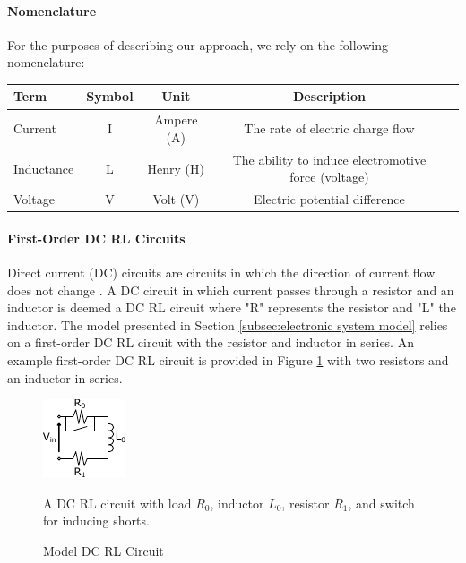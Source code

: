 \paragraph{Nomenclature}
For the purposes of describing our approach, we rely on the following nomenclature:

\begin{center}
\bgroup
\begin{tabular}{| l | c | c | c | l |}
    \hline
    Term & Symbol & Unit & Description\\  \hline \hline \cline{1-4}
    Current & I & Ampere (A) & The rate of electric charge flow \\ \cline{1-4}
    Inductance & L & Henry (H) & The ability to induce electromotive force (voltage)\\ \cline{1-4}
    Voltage & V & Volt (V) & Electric potential difference \\ \cline{1-4}
    \hline  
\end{tabular}
\egroup
\end{center}

\paragraph{First-Order DC RL Circuits}
Direct current (DC) circuits are circuits in which the direction of current flow does not change \cite{young_sears_2012}.
A DC circuit in which current passes through a resistor and an inductor is deemed a DC RL circuit where "R" represents the resistor and "L" the inductor.
The model presented in Section \ref{subsec:electronic system model} relies on a first-order DC RL circuit with the resistor and inductor in series.
An example first-order DC RL circuit is provided in Figure \ref{fig:ModelDCRL} with two resistors and an inductor in series.
\begin{figure}
    \centering
    \includegraphics[width=0.25\linewidth]{fig/Model_DC_RL_Circuit_General.pdf}
    \caption{Model DC RL Circuit} A DC RL circuit with load $R_0$, inductor $L_0$, resistor $R_1$, and switch for inducing shorts.
    \label{fig:ModelDCRL}
\end{figure}
